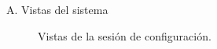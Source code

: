 \begin{annexes}{A. Vistas del sistema}
\begin{figure}[!ht]
        \caption{Vistas de la sesión de configuración.}
        \label{annex: 4}
    \end{figure}


\end{annexes}
